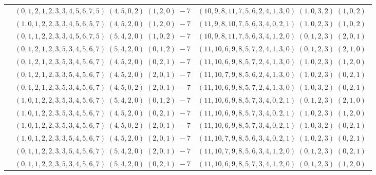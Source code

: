 \documentclass[11pt]{article}
\begin{document}
\begin{longtable}[l]{|c|c|c|}
 \cline{2-3} 
 & $(0 ,1 ,2 ,1 ,2 ,3 ,3 ,4 ,5 ,6 ,7 ,5) \;(4 ,5 ,0 ,2) \;(1 ,2 ,0) \;-7$ & $(10 ,9 ,8 ,11 ,7 ,5 ,6 ,2 ,4 ,1 ,3 ,0) \;(1 ,0 ,3 ,2) \;(1 ,0 ,2) \;$\\ 
 \cline{2-3} 
 & $(1 ,0 ,1 ,2 ,2 ,3 ,3 ,4 ,5 ,6 ,5 ,7) \;(4 ,5 ,2 ,0) \;(1 ,2 ,0) \;-7$ & $(11 ,9 ,8 ,10 ,7 ,5 ,6 ,3 ,4 ,0 ,2 ,1) \;(1 ,0 ,2 ,3) \;(1 ,0 ,2) \;$\\ 
 \cline{2-3} 
 & $(0 ,1 ,1 ,2 ,2 ,3 ,3 ,4 ,5 ,6 ,7 ,5) \;(5 ,4 ,2 ,0) \;(1 ,0 ,2) \;-7$ & $(10 ,9 ,8 ,11 ,7 ,5 ,6 ,3 ,4 ,1 ,2 ,0) \;(0 ,1 ,2 ,3) \;(2 ,0 ,1) \;$\\ 
 \cline{2-3} 
 & $(0 ,1 ,2 ,1 ,2 ,3 ,5 ,3 ,4 ,5 ,6 ,7) \;(5 ,4 ,2 ,0) \;(0 ,1 ,2) \;-7$ & $(11 ,10 ,6 ,9 ,8 ,5 ,7 ,2 ,4 ,1 ,3 ,0) \;(0 ,1 ,2 ,3) \;(2 ,1 ,0) \;$\\ 
 \cline{2-3} 
 & $(0 ,1 ,2 ,1 ,2 ,3 ,5 ,3 ,4 ,5 ,6 ,7) \;(4 ,5 ,2 ,0) \;(0 ,2 ,1) \;-7$ & $(11 ,10 ,6 ,9 ,8 ,5 ,7 ,2 ,4 ,1 ,3 ,0) \;(1 ,0 ,2 ,3) \;(1 ,2 ,0) \;$\\ 
 \cline{2-3} 
 & $(0 ,1 ,2 ,1 ,2 ,3 ,3 ,5 ,4 ,5 ,6 ,7) \;(4 ,5 ,2 ,0) \;(2 ,0 ,1) \;-7$ & $(11 ,10 ,7 ,9 ,8 ,5 ,6 ,2 ,4 ,1 ,3 ,0) \;(1 ,0 ,2 ,3) \;(0 ,2 ,1) \;$\\ 
 \cline{2-3} 
 & $(0 ,1 ,2 ,1 ,2 ,3 ,5 ,3 ,4 ,5 ,6 ,7) \;(4 ,5 ,0 ,2) \;(2 ,0 ,1) \;-7$ & $(11 ,10 ,6 ,9 ,8 ,5 ,7 ,2 ,4 ,1 ,3 ,0) \;(1 ,0 ,3 ,2) \;(0 ,2 ,1) \;$\\ 
 \cline{2-3} 
 & $(1 ,0 ,1 ,2 ,2 ,3 ,5 ,3 ,4 ,5 ,6 ,7) \;(5 ,4 ,2 ,0) \;(0 ,1 ,2) \;-7$ & $(11 ,10 ,6 ,9 ,8 ,5 ,7 ,3 ,4 ,0 ,2 ,1) \;(0 ,1 ,2 ,3) \;(2 ,1 ,0) \;$\\ 
 \cline{2-3} 
 & $(1 ,0 ,1 ,2 ,2 ,3 ,5 ,3 ,4 ,5 ,6 ,7) \;(4 ,5 ,2 ,0) \;(0 ,2 ,1) \;-7$ & $(11 ,10 ,6 ,9 ,8 ,5 ,7 ,3 ,4 ,0 ,2 ,1) \;(1 ,0 ,2 ,3) \;(1 ,2 ,0) \;$\\ 
 \cline{2-3} 
 & $(1 ,0 ,1 ,2 ,2 ,3 ,5 ,3 ,4 ,5 ,6 ,7) \;(4 ,5 ,0 ,2) \;(2 ,0 ,1) \;-7$ & $(11 ,10 ,6 ,9 ,8 ,5 ,7 ,3 ,4 ,0 ,2 ,1) \;(1 ,0 ,3 ,2) \;(0 ,2 ,1) \;$\\ 
 \cline{2-3} 
 & $(1 ,0 ,1 ,2 ,2 ,3 ,3 ,5 ,4 ,5 ,6 ,7) \;(4 ,5 ,2 ,0) \;(2 ,0 ,1) \;-7$ & $(11 ,10 ,7 ,9 ,8 ,5 ,6 ,3 ,4 ,0 ,2 ,1) \;(1 ,0 ,2 ,3) \;(0 ,2 ,1) \;$\\ 
 \cline{2-3} 
 & $(0 ,1 ,1 ,2 ,2 ,3 ,3 ,5 ,4 ,5 ,6 ,7) \;(5 ,4 ,2 ,0) \;(2 ,0 ,1) \;-7$ & $(11 ,10 ,7 ,9 ,8 ,5 ,6 ,3 ,4 ,1 ,2 ,0) \;(0 ,1 ,2 ,3) \;(0 ,2 ,1) \;$\\ 
 \cline{2-3} 
 & $(0 ,1 ,1 ,2 ,2 ,3 ,5 ,3 ,4 ,5 ,6 ,7) \;(5 ,4 ,2 ,0) \;(0 ,2 ,1) \;-7$ & $(11 ,10 ,6 ,9 ,8 ,5 ,7 ,3 ,4 ,1 ,2 ,0) \;(0 ,1 ,2 ,3) \;(1 ,2 ,0) \;$\\ 

\end{longtable}
\end{document}
